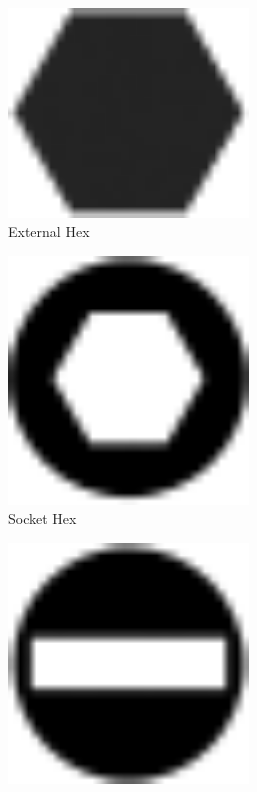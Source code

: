 \documentclass[10pt,letterpaper]{book}
\begin{document}
	\begin{figure}[H]
		\centering
		\begin{subfigure}[b]{.15\linewidth}
			\includegraphics[width=0.7\textwidth]{imgs/head_ext_hex.png}
			\caption{External Hex}
		\end{subfigure}\begin{subfigure}[b]{.15\linewidth}
			\includegraphics[width=0.7\textwidth]{imgs/head_hex.png}
			\caption{Socket Hex}
		\end{subfigure}\begin{subfigure}[b]{.15\linewidth}
			\includegraphics[width=0.7\textwidth]{imgs/head_slot.png}

\end{subfigure}
\end{figure}
\end{document}
